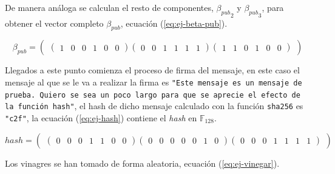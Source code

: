 De manera análoga se calculan el resto de componentes, ${\beta_{pub}}_2$ y ${\beta_{pub}}_3$, para obtener el vector completo $\beta_{pub}$, ecuación (\ref{eq:ej-beta-pub}).

\begin{equation}\label{eq:ej-beta-pub}
{\beta_{pub}} = 
	\left(\begin{matrix}
		\left(\begin{smallmatrix}
			1 & 0 & 0 & 1 & 0 & 0
		\end{smallmatrix}\right)
	
		\left(\begin{smallmatrix}
			0 & 0 & 1 & 1 & 1 & 1
		\end{smallmatrix}\right)
	
		\left(\begin{smallmatrix}
			1 & 1 & 0 & 1 & 0 & 0
		\end{smallmatrix}\right)
	\end{matrix}\right)
\end{equation}

Llegados a este punto comienza el proceso de firma del mensaje, en este caso el mensaje al que se le va a realizar la firma es \texttt{"{}Este mensaje es un mensaje de prueba. Quiero se sea un poco largo para que se aprecie el efecto de la función hash"{}}, el hash de dicho mensaje calculado con la función \texttt{sha256} es \texttt{"{}c2f"{}}, la ecuación (\ref{eq:ej-hash}) contiene el \textit{hash} en $\mathds{F}_{128}$.

\begin{equation}\label{eq:ej-hash}
	{hash} = 
	\left(\begin{matrix}
		\left(\begin{smallmatrix}
			0 & 0 & 0 & 1 & 1 & 0 & 0
		\end{smallmatrix}\right)
		
		\left(\begin{smallmatrix}
			0 & 0 & 0 & 0 & 0 & 1 & 0
		\end{smallmatrix}\right)
		
		\left(\begin{smallmatrix}
			0 & 0 & 0 & 1 & 1 & 1 & 1
		\end{smallmatrix}\right)
	\end{matrix}\right)
\end{equation}

Los vinagres se han tomado de forma aleatoria, ecuación (\ref{eq:ej-vinegar}). 


